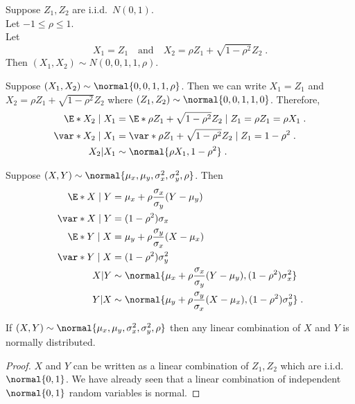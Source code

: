 \begin{fact}
Suppose $Z_1,Z_2$ are i.i.d.\ $N(0,1)$.\\
Let $-1\leq\rho\leq 1$.\\
Let 
\[
X_1 = Z_1 \quad \mbox{and} \quad X_2 = \rho Z_1 + \sqrt{1-\rho^2} Z_2 \;.
\]
Then $(X_1,X_2)\sim N(0,0,1,1,\rho)$.
\end{fact}

\begin{fact}
Suppose $(X_1,X_2)\sim\normal{0,0,1,1,\rho}$. Then we can write $X_1=Z_1$ and $X_2=\rho Z_1+\sqrt{1-\rho^2} Z_2$ where $(Z_1,Z_2)\sim\normal{0,0,1,1,0}$. Therefore,
\begin{align*}
\E*{X_2\given X_1} ={} & \E*{\rho Z_1+\sqrt{1-\rho^2}Z_2\given Z_1} = \rho Z_1 = \rho X_1\;.\\
\var*{X_2\given X_1} ={} & \var*{\rho Z_1+\sqrt{1-\rho^2}Z_2\given Z_1} = 1-\rho^2 \;.\\
X_2|X_1 \sim{} & \normal{\rho X_1, 1-\rho^2}\;.
\end{align*}
\end{fact}

\begin{proposition}
Suppose $(X,Y)\sim\normal{\mu_x,\mu_y,\sigma_x^2,\sigma_y^2,\rho}$.
Then
\begin{align*}
\E*{X\given Y} ={} & \mu_x + \rho \frac{\sigma_x}{\sigma_y}(Y-\mu_y) \\
\var*{X\given Y} ={} & (1-\rho^2) \sigma_x \\
\E*{Y\given X} ={} & \mu_y + \rho\frac{\sigma_y}{\sigma_x} (X-\mu_x) \\
\var*{Y\given X} ={} & (1-\rho^2) \sigma_y^2 \\
X|Y \sim{} & \normal{\mu_x + \rho \frac{\sigma_x}{\sigma_y}(Y-\mu_y),(1-\rho^2) \sigma_x^2} \\
Y|X \sim{} & \normal{\mu_y + \rho \frac{\sigma_y}{\sigma_x}(X-\mu_x),(1-\rho^2) \sigma_y^2} \;.
\end{align*}
\end{proposition}

\begin{proposition}
If $(X,Y)\sim\normal{\mu_x,\mu_y,\sigma_x^2,\sigma_y^2,\rho}$ then any linear combination of $X$ and $Y$ is normally distributed.    
\end{proposition}

\begin{proof}
$X$ and $Y$ can be written as a linear combination of
$Z_1,Z_2$ which are i.i.d.\ $\normal{0,1}$. We have already seen that a linear combination of independent $\normal{0,1}$ random variables is normal.
\end{proof}


